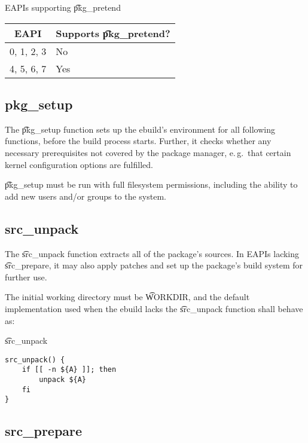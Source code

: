 \begin{centertable}{EAPIs supporting \t{pkg_pretend}}
    \label{tab:pkg-pretend-table}
    \begin{tabular}{ll}
      \toprule
      \multicolumn{1}{c}{\textbf{EAPI}} &
      \multicolumn{1}{c}{\textbf{Supports \t{pkg_pretend}?}} \\
      \midrule
      0, 1, 2, 3        & No  \\
      4, 5, 6, 7        & Yes \\
      \bottomrule
    \end{tabular}
\end{centertable}

\subsection{pkg_setup}

The \t{pkg_setup} function sets up the ebuild's environment for all following functions, before
the build process starts. Further, it checks whether any necessary prerequisites not covered
by the package manager, e.\,g.\ that certain kernel configuration options are fulfilled.

\t{pkg_setup} must be run with full filesystem permissions, including the ability to add new users
and/or groups to the system.

\subsection{src_unpack}

The \t{src_unpack} function extracts all of the package's sources. In EAPIs lacking
\t{src_prepare}, it may also apply patches and set up the package's build system for further use.

The initial working directory must be \t{WORKDIR}, and the default implementation used when
the ebuild lacks the \t{src_unpack} function shall behave as:

\begin{listing}[H]
\caption{\t{src_unpack}}
\begin{verbatim}
src_unpack() {
    if [[ -n ${A} ]]; then
        unpack ${A}
    fi
}
\end{verbatim}
\end{listing}

\subsection{src_prepare}

